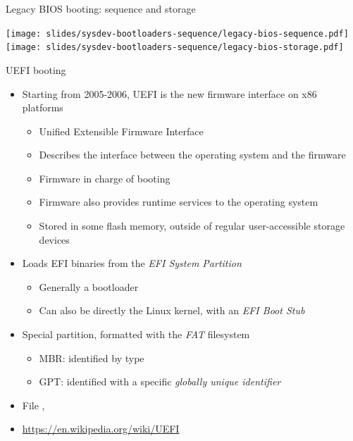 \begin{frame}{Legacy BIOS booting: sequence and storage}
  \begin{center}
    \texttt{[image: slides/sysdev-bootloaders-sequence/legacy-bios-sequence.pdf]}\\
    \vspace{0.5cm}
    \texttt{[image: slides/sysdev-bootloaders-sequence/legacy-bios-storage.pdf]}
  \end{center}
\end{frame}

\begin{frame}{UEFI booting}
  \begin{itemize}
  \item Starting from 2005-2006, UEFI is the new firmware interface on
    x86 platforms
    \begin{itemize}
    \item Unified Extensible Firmware Interface
    \item Describes the interface between the operating system and the
      firmware
    \item Firmware in charge of booting
    \item Firmware also provides runtime services to the operating
      system
    \item Stored in some flash memory, outside of regular
      user-accessible storage devices
    \end{itemize}
  \item Loads EFI binaries from the {\em EFI System Partition}
    \begin{itemize}
    \item Generally a bootloader
    \item Can also be directly the Linux kernel, with an {\em EFI Boot
        Stub}
    \end{itemize}
  \item Special partition, formatted with the {\em FAT} filesystem
    \begin{itemize}
    \item MBR: identified by type 
    \item GPT: identified with a specific {\em globally unique identifier}
    \end{itemize}
  \item File , 
  \item \url{https://en.wikipedia.org/wiki/UEFI}
  \end{itemize}
\end{frame}

